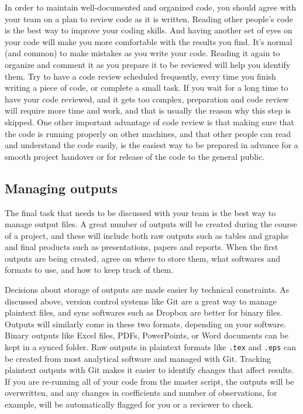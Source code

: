 In order to maintain well-documented and organized code,
you should agree with your team on a plan to review code as it is written.
Reading other people's code is the best way to improve your coding skills.
And having another set of eyes on your code will make you more comfortable with the results you find.
It's normal (and common) to make mistakes as you write your code.
Reading it again to organize and comment it as you prepare it to be reviewed will help you identify them.
Try to have a code review scheduled frequently,
every time you finish writing a piece of code, or complete a small task.
If you wait for a long time to have your code reviewed, and it gets too complex,
preparation and code review will require more time and work,
and that is usually the reason why this step is skipped.
One other important advantage of code review is that
making sure that the code is running properly on other machines,
and that other people can read and understand the code easily,
is the easiest way to be prepared in advance for a smooth project handover
or for release of the code to the general public.

\subsection{Managing outputs}

The final task that needs to be discussed with your team is the best way to manage output files.
A great number of outputs will be created during the course of a project,
and these will include both raw outputs such as tables and graphs
and final products such as presentations, papers and reports.
When the first outputs are being created, agree on where to store them,
what softwares and formats to use, and how to keep track of them.

Decisions about storage of outputs are made easier by technical constraints.
As discussed above, version control systems like Git are a great way to manage
plaintext files, and sync softwares such as Dropbox are better for binary files.
Outputs will similarly come in these two formats, depending on your software.
Binary outputs like Excel files, PDFs, PowerPoints, or Word documents can be kept in a synced folder.
Raw outputs in plaintext formats like \texttt{.tex} and \texttt{.eps}
can be created from most analytical software and managed with Git.
Tracking plaintext outputs with Git makes it easier to identify changes that affect results.
If you are re-running all of your code from the master script,
the outputs will be overwritten,
and any changes in coefficients and number of observations, for example,
will be automatically flagged for you or a reviewer to check.

